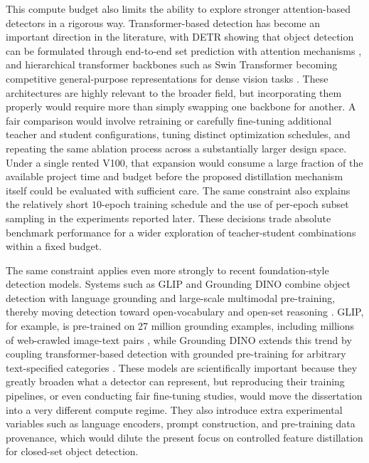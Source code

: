 This compute budget also limits the ability to explore stronger attention-based detectors in a rigorous way. Transformer-based detection has become an important direction in the literature, with DETR showing that object detection can be formulated through end-to-end set prediction with attention mechanisms \cite{carion2020detr}, and hierarchical transformer backbones such as Swin Transformer becoming competitive general-purpose representations for dense vision tasks \cite{liu2021swin}. These architectures are highly relevant to the broader field, but incorporating them properly would require more than simply swapping one backbone for another. A fair comparison would involve retraining or carefully fine-tuning additional teacher and student configurations, tuning distinct optimization schedules, and repeating the same ablation process across a substantially larger design space. Under a single rented V100, that expansion would consume a large fraction of the available project time and budget before the proposed distillation mechanism itself could be evaluated with sufficient care. The same constraint also explains the relatively short $10$-epoch training schedule and the use of per-epoch subset sampling in the experiments reported later. These decisions trade absolute benchmark performance for a wider exploration of teacher-student combinations within a fixed budget.

The same constraint applies even more strongly to recent foundation-style detection models. Systems such as GLIP and Grounding DINO combine object detection with language grounding and large-scale multimodal pre-training, thereby moving detection toward open-vocabulary and open-set reasoning \cite{li2022glip,liu2023groundingdino}. GLIP, for example, is pre-trained on 27 million grounding examples, including millions of web-crawled image-text pairs \cite{li2022glip}, while Grounding DINO extends this trend by coupling transformer-based detection with grounded pre-training for arbitrary text-specified categories \cite{liu2023groundingdino}. These models are scientifically important because they greatly broaden what a detector can represent, but reproducing their training pipelines, or even conducting fair fine-tuning studies, would move the dissertation into a very different compute regime. They also introduce extra experimental variables such as language encoders, prompt construction, and pre-training data provenance, which would dilute the present focus on controlled feature distillation for closed-set object detection.

